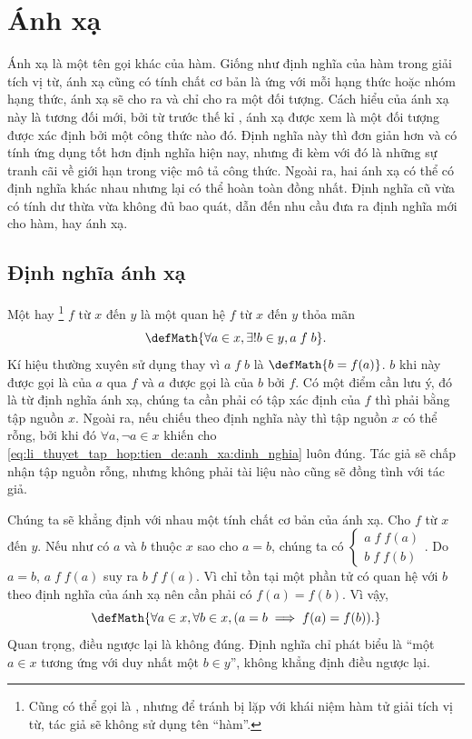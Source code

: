 \section{Ánh xạ}

Ánh xạ là một tên gọi khác của hàm. Giống như định nghĩa của hàm trong giải tích vị từ, ánh xạ cũng có tính chất cơ bản là ứng với mỗi hạng thức hoặc nhóm hạng thức, ánh xạ sẽ cho ra và chỉ cho ra một đối tượng. Cách hiểu của ánh xạ này là tương đối mới, bởi từ trước thế kỉ , ánh xạ được xem là một đối tượng được xác định bởi một công thức nào đó. Định nghĩa này thì đơn giản hơn và có tính ứng dụng tốt hơn định nghĩa hiện nay, nhưng đi kèm với đó là những sự tranh cãi về giới hạn trong việc mô tả công thức. Ngoài ra, hai ánh xạ có thể có định nghĩa khác nhau nhưng lại có thể hoàn toàn đồng nhất. Định nghĩa cũ vừa có tính dư thừa vừa không đủ bao quát, dẫn đến nhu cầu đưa ra định nghĩa mới cho hàm, hay ánh xạ.

\subsection{Định nghĩa ánh xạ}

Một  hay \footnote{Cũng có thể gọi là , nhưng để tránh bị lặp với khái niệm hàm tử giải tích vị từ, tác giả sẽ không sử dụng tên ``hàm''.} $f$ từ $x$ đến $y$ là một quan hệ $f$ từ $x$ đến $y$ thỏa mãn \begin{equation}
   \defMath{\forall a \in x, \exists ! b \in y, a\;f\;b }.
   \label{eq:li_thuyet_tap_hop:tien_de:anh_xa:dinh_nghia}
\end{equation}
Kí hiệu thường xuyên sử dụng thay vì $a\;f\;b$ là $\defMath{b = f(a)}$. $b$ khi này được gọi là  của $a$ qua $f$ và $a$ được gọi là  của $b$ bởi $f$. Có một điểm cần lưu ý, đó là từ định nghĩa ánh xạ, chúng ta cần phải có tập xác định của $f$ thì phải bằng tập nguồn $x$. Ngoài ra, nếu chiếu theo định nghĩa này thì tập nguồn $x$ có thể rỗng, bởi khi đó $\forall a, \neg a \in x$ khiến cho \eqref{eq:li_thuyet_tap_hop:tien_de:anh_xa:dinh_nghia} luôn đúng. Tác giả sẽ chấp nhận tập nguồn rỗng, nhưng không phải tài liệu nào cũng sẽ đồng tình với tác giả.

Chúng ta sẽ khẳng định với nhau một tính chất cơ bản của ánh xạ. Cho $f$ từ $x$ đến $y$. Nếu như có $a$ và $b$ thuộc $x$ sao cho $a = b$, chúng ta có $\begin{cases}
   a\;f\;f(a) \\
   b\;f\;f(b)
\end{cases}$. Do $a = b$, $a\;f\;f(a)$ suy ra $b\;f\;f(a)$. Vì chỉ tồn tại một phần tử có quan hệ với $b$ theo định nghĩa của ánh xạ nên cần phải có $f(a) = f(b)$. Vì vậy, \begin{equation*}
   \defMath{\forall a \in x, \forall b \in x, (a = b \implies f(a) = f(b)).}
\end{equation*}
Quan trọng, điều ngược lại là không đúng. Định nghĩa chỉ phát biểu là ``một $a \in x$ tương ứng với duy nhất một $b \in y$'', không khẳng định điều ngược lại.

